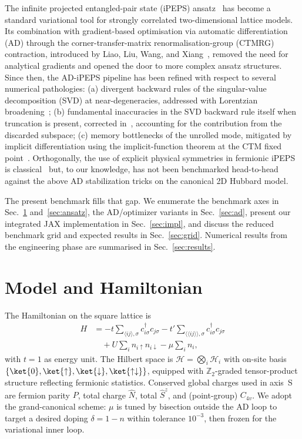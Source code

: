 \documentclass[aps,prb,reprint,amsmath,amssymb,floatfix]{revtex4-2}
\newcommand{\Z}{\mathbb{Z}}
\newcommand{\HH}{\mathcal{H}}
\begin{document}
The infinite projected entangled-pair state (iPEPS) ansatz~\cite{Jordan2008} has become a standard variational tool for strongly correlated two-dimensional lattice models. Its combination with gradient-based optimisation via automatic differentiation (AD) through the corner-transfer-matrix renormalisation-group (CTMRG) contraction, introduced by Liao, Liu, Wang, and Xiang~\cite{Liao2019}, removed the need for analytical gradients and opened the door to more complex ansatz structures. Since then, the AD-iPEPS pipeline has been refined with respect to several numerical pathologies:
(a) divergent backward rules of the singular-value decomposition (SVD) at near-degeneracies, addressed with Lorentzian broadening~\cite{Hasik2024};
(b) fundamental inaccuracies in the SVD backward rule itself when truncation is present, corrected in~\cite{Francuz2023}, accounting for the contribution from the discarded subspace;
(c) memory bottlenecks of the unrolled mode, mitigated by implicit differentiation using the implicit-function theorem at the CTM fixed point~\cite{Liao2019,Ahmed2022}.
Orthogonally, the use of explicit physical symmetries in fermionic iPEPS is classical~\cite{Corboz2010, Bruognolo2020} but, to our knowledge, has not been benchmarked head-to-head against the above AD stabilization tricks on the canonical 2D Hubbard model.

The present benchmark fills that gap. We enumerate the benchmark axes in Sec.~\ref{sec:model} and~\ref{sec:ansatz}, the AD/optimizer variants in Sec.~\ref{sec:ad}, present our integrated JAX implementation in Sec.~\ref{sec:impl}, and discuss the reduced benchmark grid and expected results in Sec.~\ref{sec:grid}.  Numerical results from the engineering phase are summarised in Sec.~\ref{sec:results}.

\section{Model and Hamiltonian}
\label{sec:model}

The Hamiltonian on the square lattice is
\begin{align}
\label{eq:hubbard}
H
&= -t\!\!\sum_{\langle ij\rangle,\sigma}\!\! c^\dagger_{i\sigma}c_{j\sigma}
   -t'\!\!\sum_{\langle\langle ij\rangle\rangle,\sigma}\!\! c^\dagger_{i\sigma}c_{j\sigma}\nonumber\\
   &\quad + U\sum_i n_{i\uparrow}n_{i\downarrow}
        - \mu \sum_i n_i,
\end{align}
with $t=1$ as energy unit. The Hilbert space is $\HH = \bigotimes_i \HH_i$ with on-site basis $\{\ket{0},\ket{\uparrow},\ket{\downarrow},\ket{\uparrow\downarrow}\}$, equipped with $\Z_2$-graded tensor-product structure reflecting fermionic statistics. Conserved global charges used in axis~S are fermion parity $P$, total charge $\hat N$, total $\hat S^z$, and (point-group) $C_{4v}$. We adopt the grand-canonical scheme: $\mu$ is tuned by bisection outside the AD loop to target a desired doping $\delta = 1-n$ within tolerance $10^{-3}$, then frozen for the variational inner loop.
\end{document}
